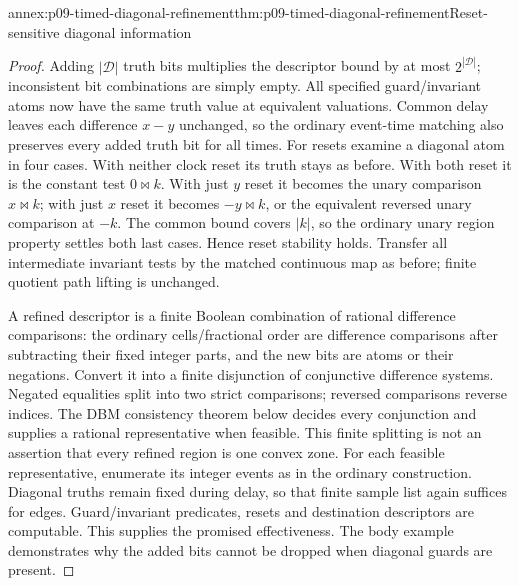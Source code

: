 \begin{annexitem}{annex:p09-timed-diagonal-refinement}{thm:p09-timed-diagonal-refinement}{Reset-sensitive diagonal information}
\begin{proof}
Adding \(|\mathcal D|\) truth bits multiplies the descriptor bound by at
most \(2^{|\mathcal D|}\); inconsistent bit combinations are simply empty.
All specified guard/invariant atoms now have the same truth value at
equivalent valuations. Common delay leaves each difference \(x-y\)
unchanged, so the ordinary event-time matching also preserves every added
truth bit for all times. For resets examine a diagonal atom in four cases.
With neither clock reset its truth stays as before. With both reset it is
the constant test \(0\bowtie k\). With just \(y\) reset it becomes the
unary comparison \(x\bowtie k\); with just \(x\) reset it becomes
\(-y\bowtie k\), or the equivalent reversed unary comparison at
\(-k\). The common bound covers \(|k|\), so the ordinary unary region
property settles both last cases. Hence reset stability holds. Transfer
all intermediate invariant tests by the matched continuous map as before;
finite quotient path lifting is unchanged.

A refined descriptor is a finite Boolean combination of rational
difference comparisons: the ordinary cells/fractional order are
difference comparisons after subtracting their fixed integer parts, and
the new bits are atoms or their negations. Convert it into a finite
disjunction of conjunctive difference systems. Negated equalities split
into two strict comparisons; reversed comparisons reverse indices.
The DBM consistency theorem below decides every conjunction and supplies
a rational representative when feasible. This finite splitting is not
an assertion that every refined region is one convex zone. For each
feasible representative, enumerate its integer events as in the ordinary
construction. Diagonal truths remain fixed during delay, so that finite
sample list again suffices for edges. Guard/invariant predicates, resets
and destination descriptors are computable. This supplies the promised
effectiveness. The body example demonstrates why the added bits cannot
be dropped when diagonal guards are present.
\end{proof}
\end{annexitem}

